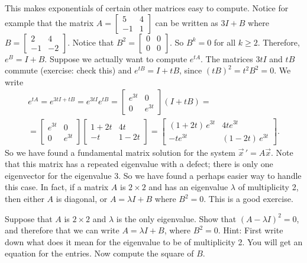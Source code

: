 \documentclass[12pt]{book}
\begin{document}
This makes exponentials of certain other matrices easy to compute.  Notice
for example that the matrix
$A = \left[ \begin{smallmatrix} 5 & 4 \\ -1 & 1 \end{smallmatrix} \right]$
can be written as
$3I + B$ where
$B = \left[ \begin{smallmatrix} 2 & 4 \\ -1 & -2 \end{smallmatrix} \right]$.
Notice that $B^2 = 
\left[ \begin{smallmatrix} 0 & 0 \\ 0 & 0 \end{smallmatrix} \right]$.  So
$B^k = 0$ for all $k \geq 2$.  Therefore, $e^B = I + B$.  Suppose we
actually want to compute $e^{tA}$.  The matrices $3tI$ and $tB$ commute
(exercise: check this)
and $e^{tB} = I + tB$, since ${(tB)}^2 = t^2 B^2 = 0$.
We write
\begin{multline*}
e^{tA} = 
e^{3tI + tB} = e^{3tI} e^{tB} = 
\begin{bmatrix} e^{3t} & 0 \\ 0 & e^{3t} \end{bmatrix}
\left(
I + tB
\right)
=
\\
=
\begin{bmatrix} e^{3t} & 0 \\ 0 & e^{3t} \end{bmatrix}
\begin{bmatrix} 1+2t & 4t \\ -t & 1-2t \end{bmatrix}
=
\begin{bmatrix} (1+2t)\,e^{3t} & 4te^{3t} \\ -te^{3t} & (1-2t)\,e^{3t} \end{bmatrix} .
\end{multline*}
So we have found a fundamental matrix solution for the
system ${\vec{x}\,}' = A \vec{x}$.  Note that this matrix has a repeated
eigenvalue with a defect; there is only one eigenvector for the eigenvalue
3.  So we have found a perhaps easier way to handle this case.  In fact, if
a matrix $A$ is $2 \times 2$ and has an eigenvalue $\lambda$ of multiplicity
2, then
either $A$ is diagonal, or $A = \lambda I + B$ where $B^2 = 0$.  This is a
good exercise.

\begin{exercise}%
Suppose that $A$ is $2 \times 2$ and $\lambda$
is the only eigenvalue.  Show that ${(A - \lambda I)}^2 = 0$, and therefore
that we can write $A = \lambda I + B$, where $B^2 = 0$.
Hint: First
write down what does it mean for the eigenvalue to be of multiplicity 2.
You will get
an equation for the entries.  Now compute the square of $B$.
\end{exercise}
\end{document}
